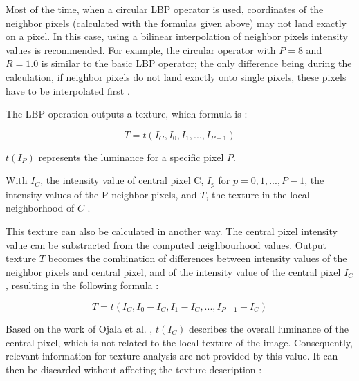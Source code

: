 \noindent Most of the time, when a circular LBP operator is used, coordinates of the neighbor pixels (calculated with the formulas given above) may not land exactly on a pixel. In this case, using a bilinear interpolation of neighbor pixels intensity values is recommended. For example, the circular operator with $ P = 8 $ and $ R = 1.0 $ is similar to the basic LBP operator; the only difference being during the calculation, if neighbor pixels do not land exactly onto single pixels, these pixels have to be interpolated first \cite{GAN08}.
\newline

\noindent The LBP operation outputs a texture, which formula is \cite{GAN08}:
\newline

\begin{equation}
   T = t(I_C, I_0, I_1, ..., I_{P-1})
\end{equation}

\noindent $t(I_P)$ represents the luminance for a specific pixel $P$.

\vspace{\baselineskip}
\noindent With $ I_C $, the intensity value of central pixel C, $ I_p $ for $ p = 0, 1, ..., P-1 $, the intensity values of the P neighbor pixels, and $ T $, the texture in the local neighborhood of $ C $ \cite{GAN08}.
\newline

\noindent This texture can also be calculated in another way. The central pixel intensity value can be substracted from the computed neighbourhood values. Output texture $ T $ becomes the combination of differences between intensity values of the neighbor pixels and central pixel, and of the intensity value of the central pixel $ I_C $, resulting in the following formula \cite{GAN08}:
\newline

\begin{equation}
   T = t(I_C, I_0 - I_C, I_1 - I_C, ..., I_{P-1} - I_C)
\end{equation}

\vspace{\baselineskip}
\noindent Based on the work of Ojala et al. \cite{OJA96}, $ t(I_C) $ describes the overall luminance of the central pixel, which is not related to the local texture of the image. Consequently, relevant information for texture analysis are not provided by this value. It can then be discarded without affecting the texture description \cite{GAN08}:
\newline

